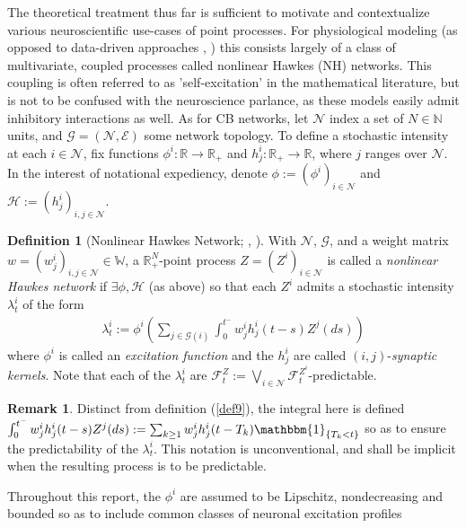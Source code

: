 \documentclass[12pt, oneside]{report}
\newcommand{\mbb}[1]{\mathbb{#1}}
\newcommand{\1}[1]{\mathbbm{1}_{\{#1\}}}
\newcommand{\mc}[1]{\mathcal{#1}}
\theoremstyle{definition}
\newtheorem{definition}[theorem]{Definition}
\newtheorem{remark}[theorem]{Remark}
\begin{document}
\indent The theoretical treatment thus far is sufficient to motivate and
contextualize various neuroscientific use-cases of point processes. For physiological modeling
(as opposed to data-driven approaches \cite{Pillow_Paninski_Uzzell_Simoncelli_Chichilnisky_2005}, \cite{Pillow_Shlens_Paninski_Sher_Litke_Chichilnisky_Simoncelli_2008})
this consists largely of a class of multivariate, coupled processes called nonlinear Hawkes (NH) networks.
This coupling is often referred to as 'self-excitation' in the mathematical
literature, but is not to be confused with the neuroscience parlance, as these
models easily admit inhibitory interactions as well. As for CB networks, let
$\mc{N}$ index a set of $N\in\mbb{N}$ units, and $\mc{G}=(\mc{N},\mc{E})$ some network topology.
To define a stochastic intensity at each
$i\in\mc{N}$, fix functions $\phi^i:\mbb{R}\rightarrow\mbb{R}_+$ and
$h^i_j:\mbb{R}_+\rightarrow\mbb{R}$, where $j$ ranges over $\mc{N}$. In the
interest of notational expediency, denote $\phi:=(\phi^i)_{i\in\mc{N}}$ and
$\mc{H}:=(h^i_j)_{i,j\in\mc{N}}$.
\begin{definition}[Nonlinear Hawkes Network; \cite{Bremaud_Massoulié_1996}, \cite{Chevallier_Caceres_Doumic_Reynaud_Bouret_2015}]\label{def10} With $\mc{N}$,
    $\mc{G}$, and a weight matrix $w=(w^i_j)_{i,j\in\mc{N}}\in\mbb{W}$, a
    $\mbb{R}_+^N$-point process $Z=(Z^i)_{i\in\mc{N}}$ is called a {\it
    nonlinear Hawkes network} if $\exists\phi,\mc{H}$ (as above) so that each
    $Z^i$ admits a stochastic intensity $\lambda^i_t$ of the form
    \begin{align*}
        \lambda_t^i:=\phi^i\left(\sum_{j\in\mc{G}(i)}\int_{0}^{t^-}w^i_jh^i_j(t-s)Z^j(ds)\right)
    \end{align*}
    where $\phi^i$ is called an {\it excitation function} and the $h^i_j$ are
    called $(i,j)$-{\it synaptic kernels}. Note that each of the $\lambda^i_t$
    are $\mc{F}^Z_t:=\bigvee_{i\in\mc{N}}\mc{F}^{Z^i}_t$-predictable.
\end{definition}
\begin{remark}
    Distinct from definition (\ref{def9}), the integral here is defined
    $\int_{0}^{t^-}w^i_jh^i_j(t-s)Z^j(ds):=\sum_{k\geq
    1}w^i_jh^i_j(t-T_k)\1{T_k<t}$ so as to ensure the predictability of the
    $\lambda^i_t$. This notation is unconventional, and shall be implicit when
    the resulting process is to be predictable.
\end{remark}
Throughout this report, the $\phi^i$ are assumed to be Lipschitz, nondecreasing
and bounded so as to include common classes of neuronal excitation profiles
\end{document}
